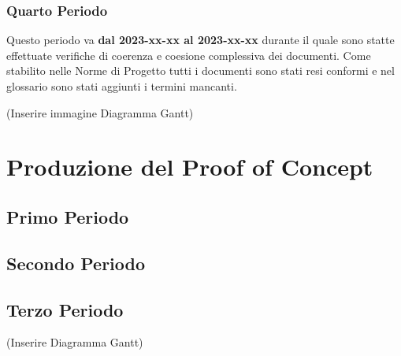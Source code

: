 \subsubsection{Quarto Periodo}
Questo periodo va \textbf{dal 2023-xx-xx al 2023-xx-xx} durante il quale sono statte effettuate verifiche di coerenza e coesione complessiva dei documenti. Come stabilito nelle Norme di Progetto tutti i documenti sono stati resi conformi e nel glossario sono stati aggiunti i termini mancanti.

(Inserire immagine Diagramma Gantt)

\section{Produzione del Proof of Concept}

\subsection{Primo Periodo}

\subsection{Secondo Periodo}

\subsection{Terzo Periodo}

(Inserire Diagramma Gantt)